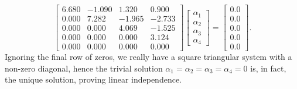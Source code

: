 $$ \left[
\begin{array}{rrrrr}
\boxed{6.680} & -1.090 & 1.320 & 0.900 \\
0.000 & \boxed{7.282} & -1.965 & -2.733 \\
0.000 & 0.000 & \boxed{4.069} & -1.525  \\
0.000 & 0.000 & 0.000 & \boxed{3.124}  \\
0.000 & 0.000 &  0.000 & 0.000
\end{array}
\right] \left[
\begin{array}{r} \alpha_1 \\ \alpha_2  \\ \alpha_3 \\ \alpha_4\end{array}
\right]=  \left[ \begin{array}{r}
0.0 \\0.0\\0.0\\0.0\\0.0
\end{array} \right].$$
Ignoring the final row of zeros, we really have a square triangular system with a non-zero diagonal, hence the trivial solution $\alpha_1=\alpha_2=\alpha_3=\alpha_4=0$ is, in fact, the unique solution, proving linear independence.\\

